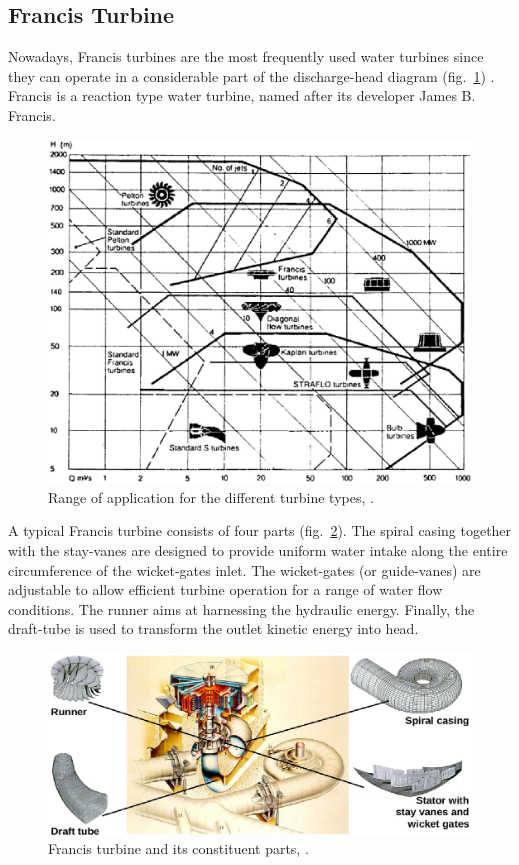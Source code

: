 \subsection{Francis Turbine}
Nowadays, Francis turbines are the most frequently used water turbines since they can operate in a considerable part of the discharge-head diagram (fig.\ \ref{range}) \cite{papanto}. Francis is a reaction type water turbine, named after its developer James B. Francis. 

\begin{figure}[h!]
\centering
\includegraphics[width=140mm]{range2.eps} 
\caption{Range of application for the different turbine types, \cite{papanto}.}
\label{range}
\end{figure}

A typical Francis turbine consists of four parts (fig.\ \ref{francis1}). The spiral casing together with the stay-vanes are designed to provide uniform water intake along the entire circumference of the wicket-gates inlet. The wicket-gates (or guide-vanes) are adjustable to allow efficient turbine operation for a range of water flow conditions. The runner aims at harnessing the hydraulic energy. Finally, the draft-tube is used to transform the outlet kinetic energy into head.

\begin{figure}[h!]
\centering
\includegraphics[width=150mm]{francis1.eps} 
\caption{Francis turbine and its constituent parts, \cite{andritz}.}
\label{francis1}
\end{figure}

